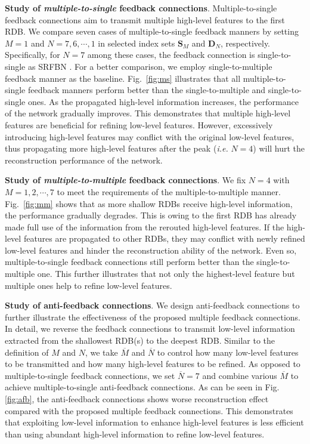 \documentclass{bmvc2k}
\begin{document}
	\noindent \textbf{Study of \textit{multiple-to-single} feedback connections}. Multiple-to-single feedback connections aim to transmit multiple high-level features to the first RDB. We compare seven cases of multiple-to-single feedback manners by setting $M=1$ and $N=7, 6, \cdots, 1$ in selected index sets $\mathbf{S}_{M}$ and $\mathbf{D}_{N}$, respectively. Specifically, for $N=7$ among these cases, the feedback connection is single-to-single as SRFBN \cite{li2019srfbn}. For a better comparison, we employ single-to-multiple feedback manner \cite{jin2017multi, zhang2018progressive} as the baseline. Fig.~\ref{fig:ms} illustrates that all multiple-to-single feedback manners perform better than the single-to-multiple and single-to-single ones. As the propagated high-level information increases, the performance of the network gradually improves. This demonstrates that multiple high-level features are beneficial for refining low-level features. However, excessively introducing high-level features may conflict with the original low-level features, thus propagating more high-level features after the peak (\textit{i.e.} $N=4$) will hurt the reconstruction performance of the network.

	\noindent \textbf{Study of \textit{multiple-to-multiple} feedback connections}. We fix $N=4$ with $M=1, 2, \cdots, 7$ to meet the requirements of the multiple-to-multiple manner. Fig.~\ref{fig:mm} shows that as more shallow RDBs receive high-level information, the performance gradually degrades. This is owing to the first RDB has already made full use of the information from the rerouted high-level features. If the high-level features are propagated to other RDBs, they may conflict with newly refined low-level features and hinder the reconstruction ability of the network. Even so, multiple-to-single feedback connections still perform better than the single-to-multiple one. This further illustrates that not only the highest-level feature but multiple ones help to refine low-level features.
	
	\noindent \textbf{Study of anti-feedback connections}. We design anti-feedback connections to further illustrate the effectiveness of the proposed multiple feedback connections. In detail, we reverse the feedback connections to transmit low-level information extracted from the shallowest RDB(s) to the deepest RDB. Similar to the definition of $M$ and $N$, we take $\overline M$ and $\overline N$ to control how many low-level features to be transmitted and how many high-level features to be refined. As opposed to multiple-to-single feedback connections, we set $\overline N = 7$ and combine various $\overline{M}$ to achieve multiple-to-single anti-feedback connections. As can be seen in Fig. \ref{fig:afb}, the anti-feedback connections shows worse reconstruction effect compared with the proposed multiple feedback connections. This demonstrates that exploiting low-level information to enhance high-level features is less efficient than using abundant high-level information to refine low-level features. 
\end{document}
